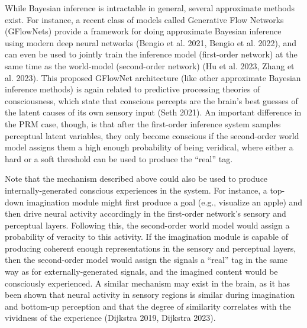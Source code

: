 \documentclass[12pt]{article}
\begin{document}
While Bayesian inference is intractable in general, several approximate methods exist. For instance, a recent class of models called Generative Flow Networks (GFlowNets) provide a framework for doing approximate Bayesian inference using modern deep neural networks (Bengio et al. 2021, Bengio et al. 2022), and can even be used to jointly train the inference model (first-order network) at the same time as the world-model (second-order network) (Hu et al. 2023, Zhang et al. 2023). This proposed GFlowNet architecture (like other approximate Bayesian inference methods) is again related to predictive processing theories of consciousness, which state that conscious percepts are the brain’s best guesses of the latent causes of its own sensory input (Seth 2021). An important difference in the PRM case, though, is that after the first-order inference system samples perceptual latent variables, they only become conscious if the second-order world model assigns them a high enough probability of being veridical, where either a hard or a soft threshold can be used to produce the ``real'' tag.

Note that the mechanism described above could also be used to produce internally-generated conscious experiences in the system. For instance, a top-down imagination module might first produce a goal (e.g., visualize an apple) and then drive neural activity accordingly in the first-order network’s sensory and perceptual layers. Following this, the second-order world model would assign a probability of veracity to this activity. If the imagination module is capable of producing coherent enough representations in the sensory and perceptual layers, then the second-order model would assign the signals a ``real'' tag in the same way as for externally-generated signals, and the imagined content would be consciously experienced. A similar mechanism may exist in the brain, as it has been shown that neural activity in sensory regions is similar during imagination and bottom-up perception and that the degree of similarity correlates with the vividness of the experience (Dijkstra 2019, Dijkstra 2023).
\end{document}
